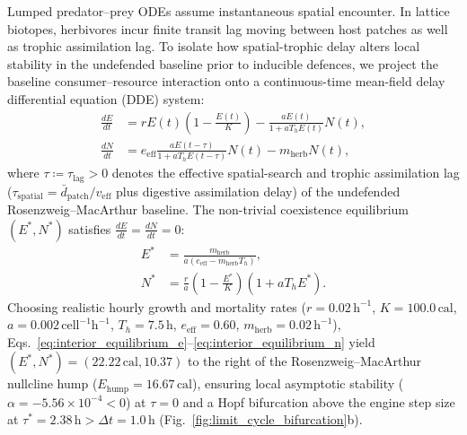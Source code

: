 Lumped predator--prey ODEs \cite{rosenzweig1963graphical} assume instantaneous spatial encounter. In lattice biotopes, herbivores incur finite transit lag moving between host patches as well as trophic assimilation lag. To isolate how spatial-trophic delay alters local stability in the undefended baseline prior to inducible defences, we project the baseline consumer--resource interaction onto a continuous-time mean-field delay differential equation (DDE) system:
\begin{align}
  \frac{dE}{dt} &= r E(t) \left(1 - \frac{E(t)}{K}\right) - \frac{a E(t)}{1 + a T_h E(t)} N(t), \label{eq:dde_flora} \\
  \frac{dN}{dt} &= e_{\mathrm{eff}} \frac{a E(t - \tau)}{1 + a T_h E(t - \tau)} N(t) - m_{\mathrm{herb}} N(t), \label{eq:dde_herb}
\end{align}
where $\tau \coloneqq \tau_{\mathrm{lag}} > 0$ denotes the effective spatial-search and trophic assimilation lag ($\tau_{\mathrm{spatial}} = \bar{d}_{\mathrm{patch}} / v_{\mathrm{eff}}$ plus digestive assimilation delay) of the undefended Rosenzweig--MacArthur baseline. The non-trivial coexistence equilibrium $(E^*, N^*)$ satisfies $\frac{dE}{dt} = \frac{dN}{dt} = 0$:
\begin{align}
  E^* &= \frac{m_{\mathrm{herb}}}{a (e_{\mathrm{eff}} - m_{\mathrm{herb}} T_h)}, \label{eq:interior_equilibrium_e} \\
  N^* &= \frac{r}{a}\left(1 - \frac{E^*}{K}\right)(1 + a T_h E^*). \label{eq:interior_equilibrium_n}
\end{align}
Choosing realistic hourly growth and mortality rates ($r = 0.02\,\text{h}^{-1}$, $K = 100.0\,\text{cal}$, $a = 0.002\,\text{cell}^{-1}\text{h}^{-1}$, $T_h = 7.5\,\text{h}$, $e_{\mathrm{eff}} = 0.60$, $m_{\mathrm{herb}} = 0.02\,\text{h}^{-1}$), Eqs.~\eqref{eq:interior_equilibrium_e}--\eqref{eq:interior_equilibrium_n} yield $(E^*, N^*) = (22.22\,\text{cal}, 10.37)$ to the right of the Rosenzweig--MacArthur nullcline hump ($E_{\mathrm{hump}} = 16.67\,\text{cal}$), ensuring local asymptotic stability ($\alpha = -5.56 \times 10^{-4} < 0$) at $\tau = 0$ and a Hopf bifurcation above the engine step size at $\tau^* = 2.38\,\text{h} > \Delta t = 1.0\,\text{h}$ (Fig.~\ref{fig:limit_cycle_bifurcation}b).

